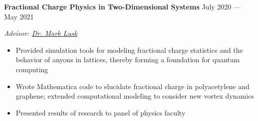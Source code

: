 \documentclass{article}
\numberwithin{equation}{section}
\begin{document}
\hspace{1.5em} \textbf{Fractional Charge Physics in Two-Dimensional Systems} \hfill July 2020 --- May 2021

\hspace{1.5em} \textit{Advisor: \href{https://people.mines.edu/mlusk/}{Dr. Mark Lusk}}

\vspace{-0.5em}

\begin{itemize}[leftmargin=6.0em]
\setlength{\itemsep}{0em}
\item Provided simulation tools for modeling fractional charge statistics and the behavior of anyons in lattices, thereby forming a foundation for quantum computing
\item Wrote Mathematica code to elucidate fractional charge in polyacetylene and graphene; extended computational modeling to consider new vortex dynamics
\item Presented results of research to panel of physics faculty
\end{itemize}
\end{document}
